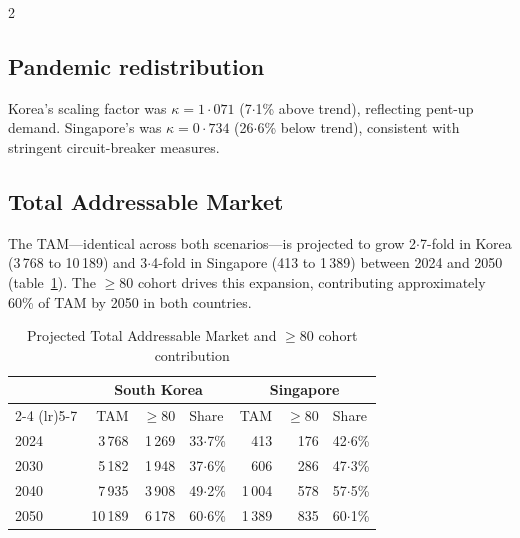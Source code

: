 \documentclass[10pt, a4paper]{article}
\begin{document}
\begin{multicols}{2}

\subsection{Pandemic redistribution}

Korea's scaling factor was $\kappa = 1{\cdot}071$ (7$\cdot$1\% above trend), reflecting pent-up demand. Singapore's was $\kappa = 0{\cdot}734$ (26$\cdot$6\% below trend), consistent with stringent circuit-breaker measures.

\subsection{Total Addressable Market}

The TAM---identical across both scenarios---is projected to grow 2$\cdot$7-fold in Korea (3\,768 to 10\,189) and 3$\cdot$4-fold in Singapore (413 to 1\,389) between 2024 and 2050 (table~\ref{tab:tam}). The $\geq$80 cohort drives this expansion, contributing approximately 60\% of TAM by 2050 in both countries.

\end{multicols}

\begin{table}[H]
\centering
\caption{Projected Total Addressable Market and $\geq$80 cohort contribution}
\label{tab:tam}
\smallskip
\small
\begin{tabular}{@{}l rrl rrl@{}}
\toprule
& \multicolumn{3}{c}{\textbf{South Korea}} & \multicolumn{3}{c}{\textbf{Singapore}} \\
\cmidrule(lr){2-4} \cmidrule(lr){5-7}
 & TAM & $\geq$80 & Share & TAM & $\geq$80 & Share \\
\midrule
2024             & 3\,768  & 1\,269 & 33$\cdot$7\% & 413   & 176 & 42$\cdot$6\% \\
2030             & 5\,182  & 1\,948 & 37$\cdot$6\% & 606   & 286 & 47$\cdot$3\% \\
2040             & 7\,935  & 3\,908 & 49$\cdot$2\% & 1\,004 & 578 & 57$\cdot$5\% \\
2050             & 10\,189 & 6\,178 & 60$\cdot$6\% & 1\,389 & 835 & 60$\cdot$1\% \\
\bottomrule
\end{tabular}
\end{table}

\end{document}
